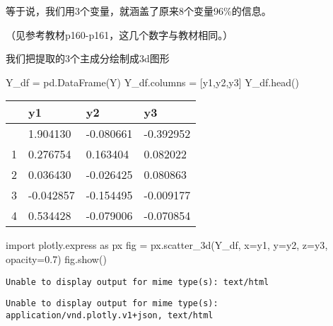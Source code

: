 \documentclass[
  letterpaper,
  DIV=11,
  numbers=noendperiod]{scrreprt}
\newenvironment{Shaded}{\begin{snugshade}}{\end{snugshade}}
\newcommand{\FloatTok}[1]{\textcolor[rgb]{0.68,0.00,0.00}{#1}}
\newcommand{\ImportTok}[1]{\textcolor[rgb]{0.00,0.46,0.62}{#1}}
\newcommand{\NormalTok}[1]{\textcolor[rgb]{0.00,0.23,0.31}{#1}}
\newcommand{\OperatorTok}[1]{\textcolor[rgb]{0.37,0.37,0.37}{#1}}
\newcommand{\StringTok}[1]{\textcolor[rgb]{0.13,0.47,0.30}{#1}}
\begin{document}
等于说，我们用3个变量，就涵盖了原来8个变量96\%的信息。

（见参考教材p160-p161，这几个数字与教材相同。）

我们把提取的3个主成分绘制成3d图形

\begin{Shaded}
\begin{Highlighting}[]
\NormalTok{Y\_df }\OperatorTok{=}\NormalTok{ pd.DataFrame(Y)}
\NormalTok{Y\_df.columns }\OperatorTok{=}\NormalTok{ [}\StringTok{\textquotesingle{}y1\textquotesingle{}}\NormalTok{,}\StringTok{\textquotesingle{}y2\textquotesingle{}}\NormalTok{,}\StringTok{\textquotesingle{}y3\textquotesingle{}}\NormalTok{]}
\NormalTok{Y\_df.head()}
\end{Highlighting}
\end{Shaded}

\begin{longtable}[]{@{}llll@{}}
\toprule\noalign{}
& y1 & y2 & y3 \\
\midrule\noalign{}
\endhead
\bottomrule\noalign{}
\endlastfoot
0 & 1.904130 & -0.080661 & -0.392952 \\
1 & 0.276754 & 0.163404 & 0.082022 \\
2 & 0.036430 & -0.026425 & 0.080863 \\
3 & -0.042857 & -0.154495 & -0.009177 \\
4 & 0.534428 & -0.079006 & -0.070854 \\
\end{longtable}

\begin{Shaded}
\begin{Highlighting}[]
\ImportTok{import}\NormalTok{ plotly.express }\ImportTok{as}\NormalTok{ px}
\NormalTok{fig }\OperatorTok{=}\NormalTok{ px.scatter\_3d(Y\_df, x}\OperatorTok{=}\StringTok{\textquotesingle{}y1\textquotesingle{}}\NormalTok{, y}\OperatorTok{=}\StringTok{\textquotesingle{}y2\textquotesingle{}}\NormalTok{, z}\OperatorTok{=}\StringTok{\textquotesingle{}y3\textquotesingle{}}\NormalTok{, opacity}\OperatorTok{=}\FloatTok{0.7}\NormalTok{)}
\NormalTok{fig.show()}
\end{Highlighting}
\end{Shaded}

\begin{verbatim}
Unable to display output for mime type(s): text/html
\end{verbatim}

\begin{verbatim}
Unable to display output for mime type(s): application/vnd.plotly.v1+json, text/html
\end{verbatim}
\end{document}
